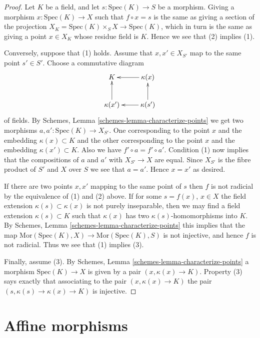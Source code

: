 \begin{proof}
Let $K$ be a field, and let $s : \text{Spec}(K) \to S$ be a morphism.
Giving a morphism $x : \text{Spec}(K) \to X$ such that $f \circ x = s$
is the same as giving a section of the projection
$X_K = \text{Spec}(K) \times_S X \to \text{Spec}(K)$, which in turn
is the same as giving a point $x \in X_K$ whose residue field is $K$.
Hence we see that (2) implies (1).

\medskip\noindent
Conversely, suppose that (1) holds. Assume that $x, x' \in X_{S'}$
map to the same point $s' \in S'$. Choose a commutative diagram
$$
\xymatrix{
K & \kappa(x) \ar[l] \\
\kappa(x') \ar[u] & \kappa(s') \ar[l] \ar[u]
}
$$
of fields. By Schemes, Lemma \ref{schemes-lemma-characterize-points}
we get two morphisms $a, a' : \text{Spec}(K) \to X_{S'}$. One corresponding
to the point $x$ and the embedding $\kappa(x) \subset K$ and
the other corresponding to the  point $x$ and the embedding
$\kappa(x') \subset K$. Also we have $f' \circ a = f' \circ a'$.
Condition (1) now implies that the compositions of $a$ and $a'$ with
$X_{S'} \to X$ are equal. Since $X_{S'}$ is the fibre product
of $S'$ and $X$ over $S$ we see that $a = a'$. Hence $x = x'$ as
desired.

\medskip\noindent
If there are two points $x, x'$ mapping to the same point of $s$
then $f$ is not radicial by the equivalence of (1) and (2) above.
If for some $s = f(x)$, $x \in X$ the field extension
$\kappa(s) \subset \kappa(x)$ is not purely inseparable, then
we may find a field extension $\kappa(s) \subset K$ such that
$\kappa(x)$ has two $\kappa(s)$-homomorphisms into $K$. By
Schemes, Lemma \ref{schemes-lemma-characterize-points} this
implies that the map
$\text{Mor}(\text{Spec}(K), X) \to \text{Mor}(\text{Spec}(K), S)$
is not injective, and hence $f$ is not radicial.
Thus we see that (1) implies (3).

\medskip\noindent
Finally, assume (3). By
Schemes, Lemma \ref{schemes-lemma-characterize-points} a morphism
$\text{Spec}(K) \to X$ is given by a pair $(x, \kappa(x) \to K)$.
Property (3) says exactly that associating to the pair
$(x, \kappa(x) \to K)$ the pair $(s, \kappa(s) \to \kappa(x) \to K)$
is injective.
\end{proof}











\section{Affine morphisms}
\label{section-affine}

